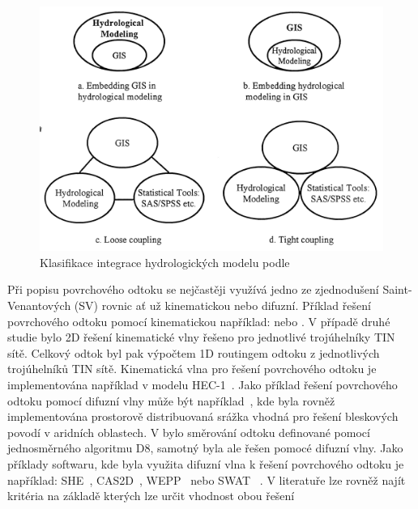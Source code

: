 \begin{figure}
  \centering
  \includegraphics[width=\linewidth]{./img/klasifikaceGISHyd.png}
  \caption{Klasifikace integrace hydrologických modelu podle~\cite{sui1999}}
  \label{fig:klasGISHyd}
\end{figure}

Při popisu povrchového odtoku se nejčastěji využívá jedno ze zjednodušení Saint-Venantových (SV) rovnic ať už kinematickou nebo difuzní. 
Příklad řešení povrchového odtoku pomocí kinematickou například: \cite{taylor1974} nebo \cite{goodrich1991}. V případě druhé studie bylo 2D řešení kinematické vlny řešeno pro jednotlivé trojúhelníky TIN sítě. Celkový odtok byl pak výpočtem 1D routingem odtoku z jednotlivých trojúhelníků TIN sítě. Kinematická vlna pro řešení povrchového odtoku je implementována například v modelu HEC-1~\citep{macarthur1993}. Jako příklad řešení povrchového odtoku pomocí difuzní vlny může být například~\cite{julien1995}, kde byla rovněž implementována prostorově distribuovaná srážka vhodná pro řešení bleskových povodí v aridních oblastech. V \cite{jain2004} bylo směrování odtoku definované pomocí jednosměrného algoritmu D8, samotný byla ale řešen pomocé difuzní vlny. Jako příklady softwaru, kde byla využita difuzní vlna k řešení povrchového odtoku je například: SHE~\cite{abbott1986_1, abbott1986_2}, CAS2D~\cite{julien1995}, WEPP~\citep{flanagan2010} nebo SWAT ~\citep{USDA}. V literatuře lze rovněž najít kritéria na základě kterých lze určit vhodnost obou řešení~\cite{singh1994, moramarco2002}

